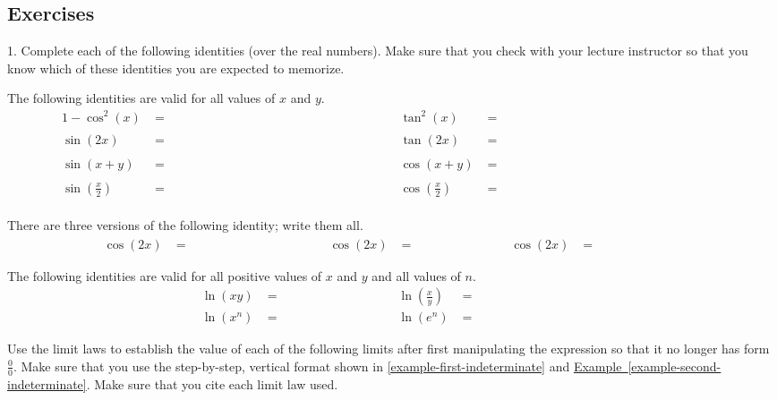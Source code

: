 \documentclass[12pt,]{book}
\theoremstyle{plain}
\theoremstyle{definition}
\theoremstyle{definition}
\theoremstyle{definition}
\theoremstyle{definition}
\theoremstyle{definition}
\numberwithin{equation}{section}
\newcommand{\fe}[2]{#1\mathopen{}\left(#2\right)\mathclose{}}
\begin{document}
\subsection[{Exercises}]{Exercises}\label{exercises-7}
\begin{exerciselist}
\item[1.]\hypertarget{exercise-identities-review}{}Complete each of the following identities (over the real numbers). Make sure that you check with your lecture instructor so that you know which of these identities you are expected to memorize.%
\par
The following identities are valid for all values of \(x\) and \(y\).\begin{align*}
1-\fe{\cos^2}{x}&=\phantom{\fe{\sin^2}{x}}&\fe{\tan^2}{x}&=\phantom{\fe{\sec^2}{x}-1}\\
\fe{\sin}{2x}&=\phantom{2\fe{\sin}{x}\fe{\cos}{x}}&\fe{\tan}{2x}&=\phantom{\frac{2\fe{\tan}{x}}{1-\fe{\tan^2}{x}}}\\
\fe{\sin}{x+y}&=\phantom{\fe{\sin}{x}\fe{\cos}{y}+\fe{\cos}{x}\fe{\sin}{y}}&\fe{\cos}{x+y}&=\phantom{\fe{\cos}{x}\fe{\cos}{y}-\fe{\sin}{x}\fe{\sin}{y}}\\
\fe{\sin}{\frac{x}{2}}&=\phantom{\sqrt{\frac{1-\fe{\cos}{x}}{2}}}&\fe{\cos}{\frac{x}{2}}&=\phantom{\sqrt{\frac{1+\fe{\cos}{x}}{2}}}
\end{align*}%
\par
There are three versions of the following identity; write them all.\begin{align*}
\fe{\cos}{2x}&=\phantom{\fe{\cos^2}{x}-\fe{\sin^2}{x}}&\fe{\cos}{2x}&=\phantom{2\fe{\cos^2}{x}-1}&\fe{\cos}{2x}&=\phantom{1-2\fe{\sin^2}{x}}
\end{align*}%
\par
The following identities are valid for all positive values of \(x\) and \(y\) and all values of \(n\).\begin{align*}
\fe{\ln}{xy}&=\phantom{\fe{\ln}{x}+\fe{\ln}{y}}&\fe{\ln}{\frac{x}{y}}&=\phantom{\fe{\ln}{x}-\fe{\ln}{y}}\\
\fe{\ln}{x^n}&=\phantom{n\fe{\ln}{x}}&\fe{\ln}{e^n}&=\phantom{n}
\end{align*}%
\par\smallskip
\end{exerciselist}
\hypertarget{exercisegroup-18}{}\par\noindent Use the limit laws to establish the value of each of the following limits after first manipulating the expression so that it
no longer has form \(\frac{0}{0}\). Make sure that you use the step-by-step, vertical format shown in \hyperref[example-first-indeterminate]{\ref{example-first-indeterminate}} and \hyperref[example-second-indeterminate]{Example~\ref{example-second-indeterminate}}. Make sure that you cite each limit law used.%
\end{document}

